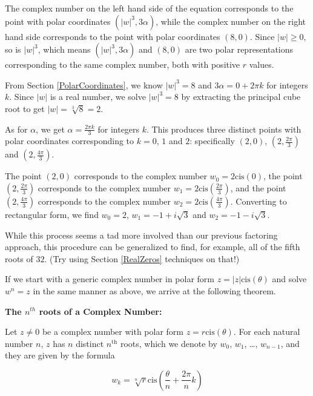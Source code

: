 \documentclass{ximera}
\begin{document}
The complex number on the left hand side of the equation corresponds to the point with polar coordinates $\left(|w|^3, 3\alpha\right)$,   while the complex number on the right hand side corresponds to the point with polar coordinates $(8,0)$.  Since $|w| \geq 0$, so is $|w|^3$, which means  $\left(|w|^3, 3\alpha\right)$ and $(8,0)$ are two polar representations corresponding to the same complex number, both with positive $r$ values.  

 

From Section \ref{PolarCoordinates}, we know $|w|^3 = 8$ and $3\alpha = 0 + 2\pi k$ for integers $k$.  Since $|w|$ is a real number, we solve $|w|^3 = 8$ by extracting the principal cube root to get  $|w| = \sqrt[3]{8} = 2$.  

 

As for $\alpha$, we get  $\alpha = \frac{2\pi k}{3}$ for integers $k$.  This produces three distinct points with polar coordinates corresponding to $k = 0$, $1$ and $2$: specifically $(2,0)$, $\left(2, \frac{2\pi}{3}\right)$ and $\left(2, \frac{4\pi}{3}\right)$.  

 

The point $(2,0)$ corresponds to the complex number  $w_0 = 2 \text{cis}(0)$,  the point $\left(2, \frac{2\pi}{3}\right)$  corresponds to the complex number $w_1 = 2 \text{cis}\left(\frac{2\pi}{3}\right)$,  and the point $\left(2, \frac{4\pi}{3}\right)$ corresponds to the complex number $w_2 = 2 \text{cis}\left(\frac{4\pi}{3}\right)$.  Converting to rectangular form, we find $w_0 = 2$, $w_1 = -1 + i\sqrt{3}$ and $w_2 = -1-i\sqrt{3}$. 

 

While this process seems a tad more involved than our previous factoring approach, this procedure can be generalized to find, for example, all of the fifth roots of $32$. (Try using Section \ref{RealZeros} techniques on that!) 

 

If we start with a generic complex number in polar form $z = |z| \text{cis}(\theta)$ and solve $w^{n} = z$ in the same manner as above, we arrive at the following theorem.

 

\begin{theorem} \label{nthrootscomplexthm} \textbf{The \boldmath $n^{th}$ roots of a Complex Number:}

 Let $z \neq 0$ be a complex number with polar form $z = r\text{cis}(\theta)$. For each natural number $n$, $z$ has $n$ distinct $n^{\text{th}}$ roots, which we denote by $w_0$, $w_1$, \ldots, $w_{n-1}$, and they are given by the formula   

\[ w_k = \sqrt[n]{r}\text{cis}\left(\frac{\theta}{n} + \frac{2\pi}{n} k \right) \]

 

\end{theorem}
\end{document}
